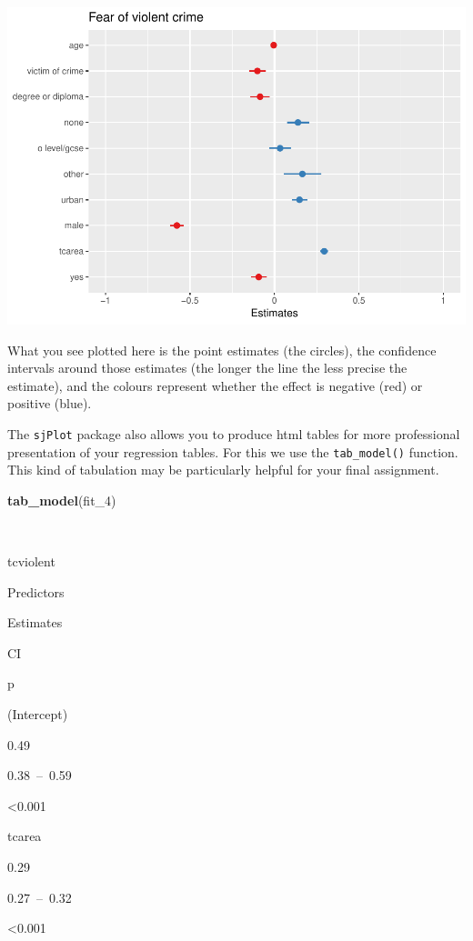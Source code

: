 \documentclass[]{book}
\newenvironment{Shaded}{\begin{snugshade}}{\end{snugshade}}
\newcommand{\DecValTok}[1]{\textcolor[rgb]{0.00,0.00,0.81}{#1}}
\newcommand{\KeywordTok}[1]{\textcolor[rgb]{0.13,0.29,0.53}{\textbf{#1}}}
\newcommand{\NormalTok}[1]{#1}
\theoremstyle{definition}
\theoremstyle{definition}
\theoremstyle{definition}
\theoremstyle{remark}
\begin{document}
\includegraphics{08-regression_files/figure-latex/unnamed-chunk-26-1.pdf}

What you see plotted here is the point estimates (the circles), the
confidence intervals around those estimates (the longer the line the
less precise the estimate), and the colours represent whether the effect
is negative (red) or positive (blue).

The \texttt{sjPlot} package also allows you to produce html tables for
more professional presentation of your regression tables. For this we
use the \texttt{tab\_model()} function. This kind of tabulation may be
particularly helpful for your final assignment.

\begin{Shaded}
\begin{Highlighting}[]
\KeywordTok{tab_model}\NormalTok{(fit_}\DecValTok{4}\NormalTok{)}
\end{Highlighting}
\end{Shaded}

~

tcviolent

Predictors

Estimates

CI

p

(Intercept)

0.49

0.38~--~0.59

\textless{}0.001

tcarea

0.29

0.27~--~0.32

\textless{}0.001
\end{document}
